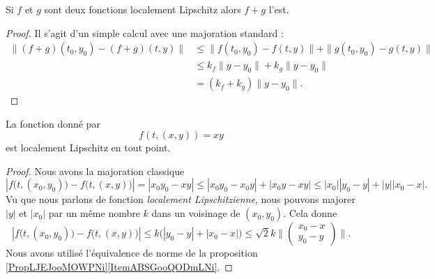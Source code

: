 \begin{proposition}     \label{PropGIBZooVsIqfY}
    Si \( f\) et \( g\) sont deux fonctions localement Lipschitz alors \( f+g\) l'est.
\end{proposition}

\begin{proof}
    Il s'agit d'un simple calcul avec une majoration standard :
    \begin{subequations}
        \begin{align}
            \| (f+g)(t_0,y_0)-(f+g)(t,y) \|&\leq \|  f(t_0,y_0)-f(t,y)  \|+\| g(t_0,y_0)-g(t,y) \|\\
            &\leq k_f\| y-y_0 \|+k_g\| y-y_0 \|\\
            &=(k_f+k_g)\| y-y_0 \|.
        \end{align}
    \end{subequations}
\end{proof}

\begin{lemma}   \label{LemCFZUooVqZmpc}
    La fonction donné par
    \begin{equation}
        f(t, (x,y) )=xy
    \end{equation}
    est localement Lipschitz en tout point.
\end{lemma}

\begin{proof}
    Nous avons la majoration classique
    \begin{equation}
        | f\big(t,(x_0,y_0)\big)-f\big( t,(x,y) \big) |=| x_0y_0-xy |\leq| x_0y_0-x_0y |+| x_0y-xy |\leq | x_0 || y_0-y |+| y || x_0-x |.
    \end{equation}
    Vu que nous parlons de fonction \emph{localement Lipschitzienne}, nous pouvons majorer \( | y |\) et \( | x_0 |\) par un même nombre \( k\) dans un voisinage de \( (x_0,y_0)\). Cela donne
    \begin{equation}
        | f\big(t,(x_0,y_0)\big)-f\big( t,(x,y) \big) |\leq k\big( | y_0-y |+| x_0-x | \big)\leq \sqrt{2}k\| \begin{pmatrix}
            x_0-x    \\ 
            y_0-y    
        \end{pmatrix}\|.
    \end{equation}
    Nous avons utilisé l'équivalence de norme de la proposition \ref{PropLJEJooMOWPNi}\ref{ItemABSGooQODmLNi}.
\end{proof}



